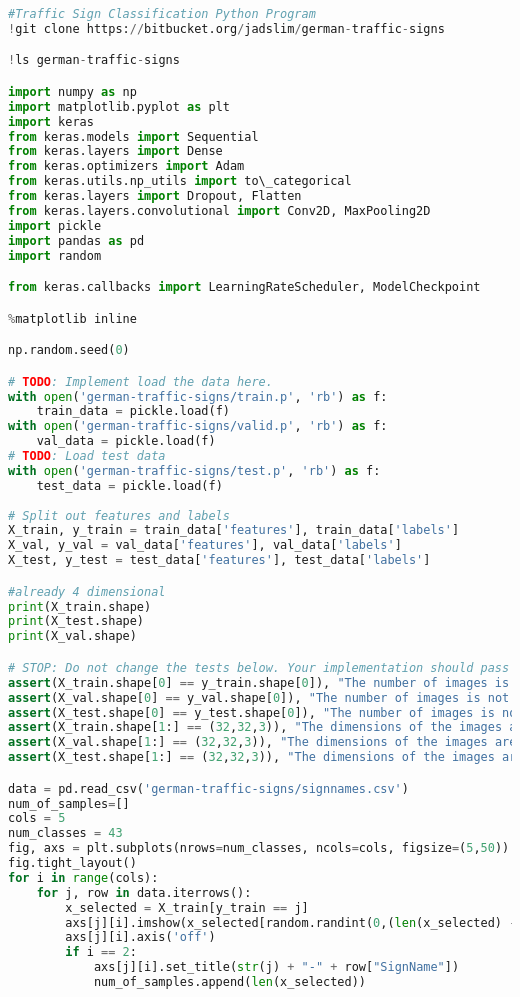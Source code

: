 \begin{lstlisting}[language=Python]
#Traffic Sign Classification Python Program
!git clone https://bitbucket.org/jadslim/german-traffic-signs

!ls german-traffic-signs

import numpy as np
import matplotlib.pyplot as plt
import keras
from keras.models import Sequential
from keras.layers import Dense
from keras.optimizers import Adam
from keras.utils.np_utils import to\_categorical
from keras.layers import Dropout, Flatten
from keras.layers.convolutional import Conv2D, MaxPooling2D
import pickle
import pandas as pd
import random

from keras.callbacks import LearningRateScheduler, ModelCheckpoint

%matplotlib inline

np.random.seed(0)

# TODO: Implement load the data here.
with open('german-traffic-signs/train.p', 'rb') as f:
	train_data = pickle.load(f)
with open('german-traffic-signs/valid.p', 'rb') as f:
	val_data = pickle.load(f)
# TODO: Load test data
with open('german-traffic-signs/test.p', 'rb') as f:
	test_data = pickle.load(f)
	
# Split out features and labels
X_train, y_train = train_data['features'], train_data['labels']
X_val, y_val = val_data['features'], val_data['labels']
X_test, y_test = test_data['features'], test_data['labels']

#already 4 dimensional
print(X_train.shape)
print(X_test.shape)
print(X_val.shape)

# STOP: Do not change the tests below. Your implementation should pass these tests.
assert(X_train.shape[0] == y_train.shape[0]), "The number of images is not equal to the number of labels"
assert(X_val.shape[0] == y_val.shape[0]), "The number of images is not equal to the number of labels"
assert(X_test.shape[0] == y_test.shape[0]), "The number of images is not equal to the number of labels"
assert(X_train.shape[1:] == (32,32,3)), "The dimensions of the images are not 32 x 32 x 3"
assert(X_val.shape[1:] == (32,32,3)), "The dimensions of the images are not 32 x 32 x 3"
assert(X_test.shape[1:] == (32,32,3)), "The dimensions of the images are not 32 x 32 x 3"

data = pd.read_csv('german-traffic-signs/signnames.csv')
num_of_samples=[]
cols = 5
num_classes = 43
fig, axs = plt.subplots(nrows=num_classes, ncols=cols, figsize=(5,50))
fig.tight_layout()
for i in range(cols):
	for j, row in data.iterrows():
		x_selected = X_train[y_train == j]
		axs[j][i].imshow(x_selected[random.randint(0,(len(x_selected) - 1)), :, :], cmap=plt.get_cmap('gray'))
		axs[j][i].axis('off')
		if i == 2:
			axs[j][i].set_title(str(j) + "-" + row["SignName"])
			num_of_samples.append(len(x_selected))


\end{lstlisting}
